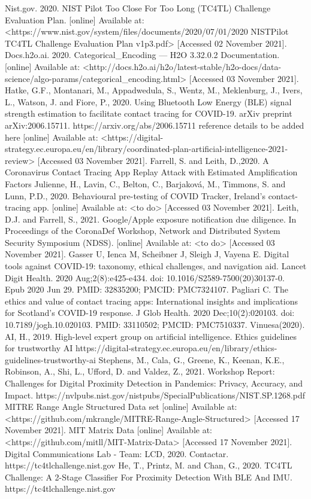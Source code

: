 \documentclass[conference]{IEEEtran}
\begin{document}
\begin{thebibliography}{00}
Nist.gov. 2020. NIST Pilot Too Close For Too Long (TC4TL) Challenge Evaluation Plan. [online] Available at: <https://www.nist.gov/system/files/documents/2020/07/01/2020 NISTPilot TC4TL Challenge Evaluation Plan v1p3.pdf> [Accessed 02 November 2021].
Docs.h2o.ai. 2020. Categorical\_Encoding — H2O 3.32.0.2 Documentation. [online] Available at: <http://docs.h2o.ai/h2o/latest-stable/h2o-docs/data-science/algo-params/categorical\_encoding.html> [Accessed 03 November 2021].
 Hatke, G.F., Montanari, M., Appadwedula, S., Wentz, M., Meklenburg, J., Ivers, L., Watson, J. and Fiore, P., 2020. Using Bluetooth Low Energy (BLE) signal strength estimation to facilitate contact tracing for COVID-19. arXiv preprint arXiv:2006.15711. https://arxiv.org/abs/2006.15711 
reference details to be added here [online] Available at: <https://digital-strategy.ec.europa.eu/en/library/coordinated-plan-artificial-intelligence-2021-review> [Accessed 03 November 2021].
 Farrell, S. and Leith, D.,2020. A Coronavirus Contact Tracing App Replay Attack with Estimated Amplification Factors 
Julienne, H., Lavin, C., Belton, C., Barjaková, M., Timmons, S. and Lunn, P.D., 2020. Behavioural pre-testing of COVID Tracker, Ireland’s contact-tracing app. [online] Available at: <to do> [Accessed 03 November 2021].
Leith, D.J. and Farrell, S., 2021. Google/Apple exposure notification due diligence. In Proceedings of the CoronaDef Workshop, Network and Distributed System Security Symposium (NDSS). [online] Available at: <to do> [Accessed 03 November 2021].
Gasser U, Ienca M, Scheibner J, Sleigh J, Vayena E. Digital tools against COVID-19: taxonomy, ethical challenges, and navigation aid. Lancet Digit Health. 2020 Aug;2(8):e425-e434. doi: 10.1016/S2589-7500(20)30137-0. Epub 2020 Jun 29. PMID: 32835200; PMCID: PMC7324107.
Pagliari C. The ethics and value of contact tracing apps: International insights and implications for Scotland's COVID-19 response. J Glob Health. 2020 Dec;10(2):020103. doi: 10.7189/jogh.10.020103. PMID: 33110502; PMCID: PMC7510337.
Vinuesa(2020).
AI, H., 2019. High-level expert group on artificial intelligence. Ethics guidelines for trustworthy AI https://digital-strategy.ec.europa.eu/en/library/ethics-guidelines-trustworthy-ai 
 Stephens, M., Cala, G., Greene, K., Keenan, K.E., Robinson, A., Shi, L., Ufford, D. and Valdez, Z., 2021. Workshop Report: Challenges for Digital Proximity Detection in Pandemics: Privacy, Accuracy, and Impact. https://nvlpubs.nist.gov/nistpubs/SpecialPublications/NIST.SP.1268.pdf
MITRE Range Angle Structured Data set [online] Available at: <https://github.com/mkrangle/MITRE-Range-Angle-Structured> [Accessed 17 November 2021].
MIT Matrix Data [online] Available at: <https://github.com/mitll/MIT-Matrix-Data> [Accessed 17 November 2021].
Digital Communications Lab - Team: LCD, 2020. Contactar. https://tc4tlchallenge.nist.gov
He, T., Printz, M. and Chan, G., 2020. TC4TL Challenge: A 2-Stage Classifier For Proximity Detection With BLE And IMU. https://tc4tlchallenge.nist.gov

\end{thebibliography}
\end{document}
